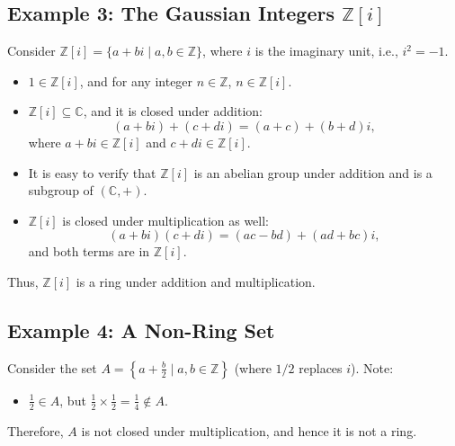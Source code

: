 \documentclass{article}
\begin{document}
\subsection*{Example 3: The Gaussian Integers \(\mathbb{Z}[i]\)}
Consider \(\mathbb{Z}[i] = \{a + bi \mid a, b \in \mathbb{Z}\}\), where \(i\) is the imaginary unit, i.e., \(i^2 = -1\).
\begin{itemize}
    \item \(1 \in \mathbb{Z}[i]\), and for any integer \(n \in \mathbb{Z}\), \(n \in \mathbb{Z}[i]\).
    \item \(\mathbb{Z}[i] \subseteq \mathbb{C}\), and it is closed under addition:
    \[
    (a + bi) + (c + di) = (a + c) + (b + d)i,
    \]
    where \(a + bi \in \mathbb{Z}[i]\) and \(c + di \in \mathbb{Z}[i]\).
    \item It is easy to verify that \(\mathbb{Z}[i]\) is an abelian group under addition and is a subgroup of \((\mathbb{C}, +)\).
    \item \(\mathbb{Z}[i]\) is closed under multiplication as well:
    \[
    (a + bi)(c + di) = (ac - bd) + (ad + bc)i,
    \]
    and both terms are in \(\mathbb{Z}[i]\).
\end{itemize}
Thus, \(\mathbb{Z}[i]\) is a ring under addition and multiplication.

\subsection*{Example 4: A Non-Ring Set}
Consider the set \(A = \left\{ a + \frac{b}{2} \mid a, b \in \mathbb{Z} \right\}\) (where \(1/2\) replaces \(i\)). Note:
\begin{itemize}
    \item \(\frac{1}{2} \in A\), but \(\frac{1}{2} \times \frac{1}{2} = \frac{1}{4} \notin A\).
\end{itemize}
Therefore, \(A\) is not closed under multiplication, and hence it is not a ring.

\end{document}
